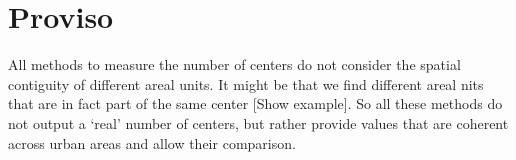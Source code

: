 \section{Proviso}
\label{sec:proviso}

All methods to measure the number of centers do not consider the spatial
contiguity of different areal units. It might be that we find different areal
nits that are in fact part of the same center [Show example]. So all these
methods do not output a `real' number of centers, but rather provide values that
are coherent across urban areas and allow their comparison.
